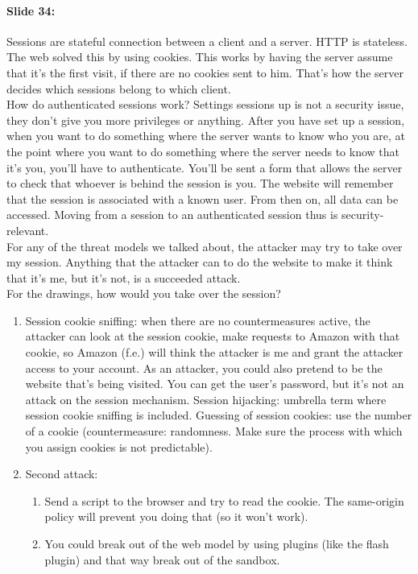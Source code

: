 \documentclass[10pt,a4paper]{report}
\begin{document}
\paragraph{Slide 34:} Sessions are stateful connection between a client and a server. HTTP is stateless. The web solved this by using cookies. This works by having the server assume that it's the first visit, if there are no cookies sent to him. That's how the server decides which sessions belong to which client. \\
How do authenticated sessions work? Settings sessions up is not a security issue, they don't give you more privileges or anything. After you have set up a session, when you want to do something where the server wants to know who you are, at the point where you want to do something where the server needs to know that it's you, you'll have to authenticate. You'll be sent a form that allows the server to check that whoever is behind the session is you. The website will remember that the session is associated with a known user. From then on, all data can be accessed. Moving from a session to an authenticated session thus is security-relevant.\\
For any of the threat models we talked about, the attacker may try to take over my session. Anything that the attacker can to do the website to make it think that it's me, but it's not, is a succeeded attack. \\
For the drawings, how would you take over the session?
\begin{enumerate}
\item Session cookie sniffing: when there are no countermeasures active, the attacker can look at the session cookie, make requests to Amazon with that cookie, so Amazon (f.e.) will think the attacker is me and grant the attacker access to your account. As an attacker, you could also pretend to be the website that's being visited. You can get the user's password, but it's not an attack on the session mechanism. Session hijacking: umbrella term where session cookie sniffing is included. Guessing of session cookies: use the number of a cookie (countermeasure: randomness. Make sure the process with which you assign cookies is not predictable). 
\item Second attack:
\begin{enumerate}
\item Send a script to the browser and try to read the cookie. The same-origin policy will prevent you doing that (so it won't work). 
\item You could break out of the web model by using plugins (like the flash plugin) and that way break out of the sandbox. 
\end{enumerate}
\end{enumerate}
\end{document}
